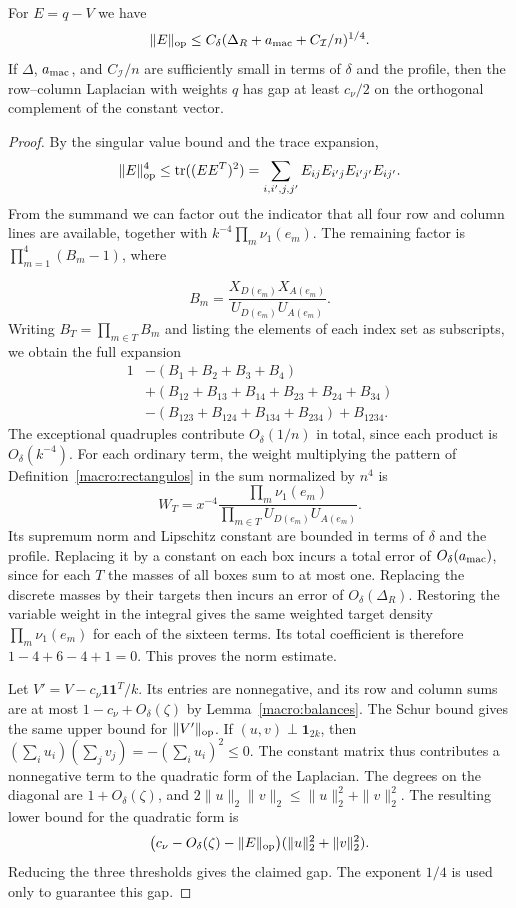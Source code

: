 \begin{lema}\label{macro:brecha}
For $E=q-V$ we have
\[
 \|E\|_{\rm op}\le C_\delta(\Delta_R+a_{\rm mac}+C_{\mathcal I}/n)^{1/4}.
\]
If $\Delta$, $a_{\rm mac}$, and $C_{\mathcal I}/n$ are sufficiently small in terms of $\delta$ and
the profile, then the row--column Laplacian with weights $q$ has gap at least $c_\nu/2$ on the
orthogonal complement of the constant vector.
\end{lema}
\begin{proof}
By the singular value bound and the trace expansion,
\[
 \|E\|_{\rm op}^4\le {\rm tr}((EE^T)^2)
 =\sum_{i,i',j,j'}E_{ij}E_{i'j}E_{i'j'}E_{ij'} .
\]
From the summand we can factor out the indicator that all four row and column lines are available,
together with $k^{-4}\prod_m\nu_1(e_m)$. The remaining factor is $\prod_{m=1}^4(B_m-1)$, where

\[ B_m=\frac{X_{D(e_m)}X_{A(e_m)}}{U_{D(e_m)}U_{A(e_m)}}. \]
Writing $B_T=\prod_{m\in T}B_m$ and listing the elements of each index set as subscripts, we obtain
the full expansion
\[
 \begin{aligned}
 1
 &-(B_1+B_2+B_3+B_4)\\
 &+(B_{12}+B_{13}+B_{14}+B_{23}+B_{24}+B_{34})\\
 &-(B_{123}+B_{124}+B_{134}+B_{234})+B_{1234}.
 \end{aligned}
\]
The exceptional quadruples contribute $O_\delta(1/n)$ in total, since each product is
$O_\delta(k^{-4})$. For each ordinary term, the weight multiplying the pattern of
Definition~\ref{macro:rectangulos} in the sum normalized by $n^4$ is
\[
 W_T=x^{-4}\frac{\prod_m\nu_1(e_m)}
                 {\prod_{m\in T}U_{D(e_m)}U_{A(e_m)}} .
\]
Its supremum norm and Lipschitz constant are bounded in terms of $\delta$ and the profile. Replacing
it by a constant on each box incurs a total error of $O_\delta(a_{\rm mac})$, since for each $T$ the
masses of all boxes sum to at most one. Replacing the discrete masses by their targets then incurs
an error of $O_\delta(\Delta_R)$. Restoring the variable weight in the integral gives the same
weighted target density $\prod_m\nu_1(e_m)$ for each of the sixteen terms. Its total coefficient is
therefore $1-4+6-4+1=0$. This proves the norm estimate.

Let $V'=V-c_\nu\mathbf1\mathbf1^T/k$. Its entries are nonnegative, and its row and column sums are
at most $1-c_\nu+O_\delta(\zeta)$ by Lemma~\ref{macro:balances}. The Schur bound gives the same
upper bound for $\|V'\|_{\rm op}$. If $(u,v)\perp\mathbf1_{2k}$, then $(\sum_i u_i)(\sum_j
v_j)=-(\sum_i u_i)^2\le0$. The constant matrix thus contributes a nonnegative term to the quadratic
form of the Laplacian. The degrees on the diagonal are $1+O_\delta(\zeta)$, and
$2\|u\|_2\|v\|_2\le\|u\|_2^2+\|v\|_2^2$. The resulting lower bound for the quadratic form is
\[
 \bigl(c_\nu-O_\delta(\zeta)-\|E\|_{\rm op}\bigr)
                   (\|u\|_2^2+\|v\|_2^2).
\]
Reducing the three thresholds gives the claimed gap. The exponent $1/4$ is used only to guarantee
this gap.
\end{proof}
